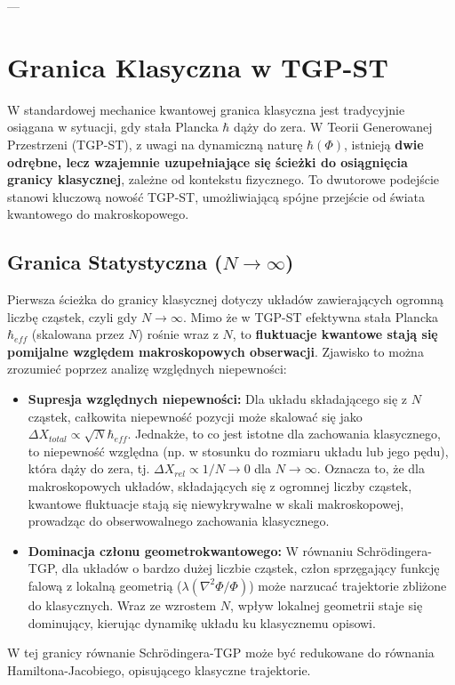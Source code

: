 \documentclass[11pt,a4paper]{article}
\begin{document}
---

\section{Granica Klasyczna w TGP-ST}
\label{sec:GranicaKlasyczna}

W standardowej mechanice kwantowej granica klasyczna jest tradycyjnie osiągana w sytuacji, gdy stała Plancka $\hbar$ dąży do zera. W Teorii Generowanej Przestrzeni (TGP-ST), z uwagi na dynamiczną naturę $\hbar(\Phi)$, istnieją \textbf{dwie odrębne, lecz wzajemnie uzupełniające się ścieżki do osiągnięcia granicy klasycznej}, zależne od kontekstu fizycznego. To dwutorowe podejście stanowi kluczową nowość TGP-ST, umożliwiającą spójne przejście od świata kwantowego do makroskopowego.

\subsection{Granica Statystyczna ($N \rightarrow \infty$)}
Pierwsza ścieżka do granicy klasycznej dotyczy układów zawierających ogromną liczbę cząstek, czyli gdy $N \rightarrow \infty$. Mimo że w TGP-ST efektywna stała Plancka $\hbar_{eff}$ (skalowana przez $N$) rośnie wraz z $N$, to \textbf{fluktuacje kwantowe stają się pomijalne względem makroskopowych obserwacji}. Zjawisko to można zrozumieć poprzez analizę względnych niepewności:
\begin{itemize}
    \item \textbf{Supresja względnych niepewności:} Dla układu składającego się z $N$ cząstek, całkowita niepewność pozycji może skalować się jako $\Delta X_{total} \propto \sqrt{N}\hbar_{eff}$. Jednakże, to co jest istotne dla zachowania klasycznego, to niepewność względna (np. w stosunku do rozmiaru układu lub jego pędu), która dąży do zera, tj. $\Delta X_{rel} \propto 1/N \rightarrow 0$ dla $N \rightarrow \infty$. Oznacza to, że dla makroskopowych układów, składających się z ogromnej liczby cząstek, kwantowe fluktuacje stają się niewykrywalne w skali makroskopowej, prowadząc do obserwowalnego zachowania klasycznego.
    \item \textbf{Dominacja członu geometrokwantowego:} W równaniu Schrödingera-TGP, dla układów o bardzo dużej liczbie cząstek, człon sprzęgający funkcję falową z lokalną geometrią ($\lambda(\nabla^2\Phi/\Phi)$) może narzucać trajektorie zbliżone do klasycznych. Wraz ze wzrostem $N$, wpływ lokalnej geometrii staje się dominujący, kierując dynamikę układu ku klasycznemu opisowi.
\end{itemize}
W tej granicy równanie Schrödingera-TGP może być redukowane do równania Hamiltona-Jacobiego, opisującego klasyczne trajektorie.
\end{document}
